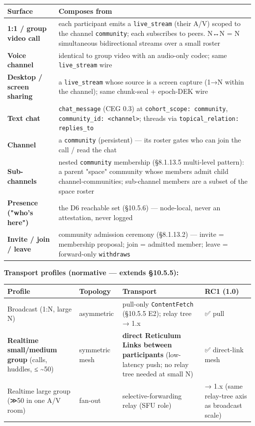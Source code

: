 \documentclass[11pt]{article}
\begin{document}
{\footnotesize
\begin{longtable}{|p{8.0cm}|p{8.0cm}|}\hline
\textbf{Surface} & \textbf{Composes from} \\ \hline\endhead
\textbf{1:1 / group video call} & each participant emits a \texttt{live\_stream} (their A/V) scoped to the channel \texttt{community}; each subscribes to peers. N↔N = N simultaneous bidirectional streams over a small roster \\ \hline
\textbf{Voice channel} & identical to group video with an audio-only codec; same \texttt{live\_stream} wire \\ \hline
\textbf{Desktop / screen sharing} & a \texttt{live\_stream} whose source is a screen capture (1→N within the channel); same chunk-seal + epoch-DEK wire \\ \hline
\textbf{Text chat} & \texttt{chat\_message} (CEG 0.3) at \texttt{cohort\_scope: community}, \texttt{community\_id: <channel>}; threads via \texttt{topical\_relation: replies\_to} \\ \hline
\textbf{Channel} & a \texttt{community} (persistent) — its roster gates who can join the call / read the chat \\ \hline
\textbf{Sub-channels} & nested \texttt{community} membership (§8.1.13.5 multi-level pattern): a parent "space" community whose members admit child channel-communities; sub-channel members are a subset of the space roster \\ \hline
\textbf{Presence ("who's here")} & the D6 reachable set (§10.5.6) — node-local, never an attestation, never logged \\ \hline
\textbf{Invite / join / leave} & community admission ceremony (§8.1.13.2) — invite = membership proposal; join = admitted member; leave = forward-only \texttt{withdraws} \\ \hline
\end{longtable}}


\textbf{Transport profiles (normative — extends §10.5.5):}


{\scriptsize
\begin{longtable}{|p{4.0cm}|p{4.0cm}|p{4.0cm}|p{4.0cm}|}\hline
\textbf{Profile} & \textbf{Topology} & \textbf{Transport} & \textbf{RC1 (1.0)} \\ \hline\endhead
Broadcast (1:N, large N) & asymmetric & pull-only \texttt{ContentFetch} (§10.5.5 E2); relay tree → 1.x & ✅ pull \\ \hline
\textbf{Realtime small/medium group} (calls, huddles, ≤ \textasciitilde{}50) & symmetric mesh & \textbf{direct Reticulum Links between participants} (low-latency push; no relay tree needed at small N) & ✅ direct-link mesh \\ \hline
Realtime large group (≫50 in one A/V room) & fan-out & selective-forwarding relay (SFU role) & → 1.x (same relay-tree axis as broadcast scale) \\ \hline
\end{longtable}}
\end{document}
